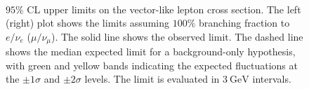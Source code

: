 \begin{figure}[htbp]
  \centering	
   \\
  \caption{$95 \%$ CL upper limits on the vector-like lepton cross section. The left (right) plot shows the limits assuming $100\%$ branching fraction to $e/\nu_e$ ($\mu/\nu_{\mu}$). The solid line shows the observed limit. The dashed line shows the median expected limit for a background-only hypothesis, with green and yellow bands indicating the expected fluctuations at the $\pm1\sigma$ and $\pm 2 \sigma$ levels. The limit is evaluated in $\SI{3}{\giga\electronvolt}$ intervals.}
  \label{fig:VLLLimit}
\end{figure}

